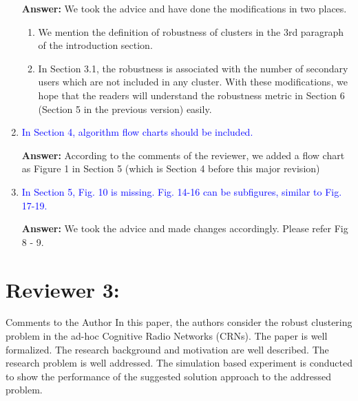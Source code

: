 \documentclass[10pt,a4paper]{article}
\begin{document}
\begin{enumerate}
\textbf{Answer:} We took the advice and have done the modifications in two places.
\begin{enumerate}
\item We mention the definition of robustness of clusters in the 3rd paragraph of the introduction section.
\item In Section 3.1, the robustness is associated with the number of secondary users which are not included in any cluster.
With these modifications, we hope that the readers will understand the robustness metric in Section 6 (Section 5 in the previous version) easily.
\end{enumerate}

 


\item \textcolor{blue}{ In Section 4, algorithm flow charts should be included.}

\textbf{Answer:} According to the comments of the reviewer, we added a flow chart as Figure 1 in Section 5 (which is Section 4 before this major revision)

\item \textcolor{blue}{ In Section 5, Fig. 10 is missing. Fig. 14-16 can be subfigures, similar to Fig. 17-19.}

\textbf{Answer:} We took the advice and made changes accordingly. 
Please refer Fig 8 - 9. 

\end{enumerate}

\section{Reviewer 3:}


Comments to the Author
In this paper, the authors consider the robust clustering problem in the ad-hoc Cognitive Radio Networks (CRNs). The paper is well formalized. The research background and motivation are well described. The research problem is well addressed. The simulation based experiment is conducted to show the performance of the suggested solution approach to the addressed problem.
\end{document}
